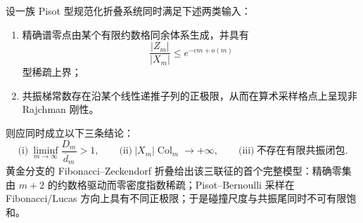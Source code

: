 \begin{conjecture}\label{conj:conclusion-pisot-fold-sparsezero-thickpeak-divergence}
设一族 Pisot 型规范化折叠系统同时满足下述两类输入：
\begin{enumerate}
  \item 精确谱零点由某个有限约数格同余体系生成，并具有
  \[
  \frac{|Z_m|}{|X_m|}\le e^{-cm+o(m)}
  \]
  型稀疏上界；
  \item 共振梯常数存在沿某个线性递推子列的正极限，从而在算术采样格点上呈现非 Rajchman 刚性。
\end{enumerate}
则应同时成立以下三条结论：
\[
\text{(i)}\ \liminf_{m\to\infty}\frac{D_m}{\overline d_m}>1,
\qquad
\text{(ii)}\ |X_m|\operatorname{Col}_m\to+\infty,
\qquad
\text{(iii)}\ \text{不存在有限共振闭包}.
\]
黄金分支的 Fibonacci--Zeckendorf 折叠给出该三联征的首个完整模型：精确零集由 \(m+2\) 的约数格驱动而零密度指数稀疏；Pisot--Bernoulli 采样在 Fibonacci/Lucas 方向上具有不同正极限；于是碰撞尺度与共振尾同时不可有限饱和。
\end{conjecture}

